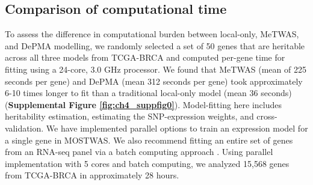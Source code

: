 \subsection{Comparison
of computational time}

To assess the difference in computational burden
between local-only, MeTWAS, and
DePMA modelling, we randomly selected a set of 50 genes
that are heritable across all three models
from TCGA-BRCA and computed per-gene
time for fitting using a 24-core, 3.0
GHz processor. We found that 
MeTWAS (mean of 225 seconds
per gene) and DePMA (mean 312 seconds
per gene) took approximately 6-10 times
longer to fit than a traditional local-only model
(mean 36 seconds) 
(\textbf{Supplemental Figure \ref{fig:ch4_suppfig0}}).
Model-fitting here includes heritability
estimation, estimating the SNP-expression
weights, and cross-validation.
We have implemented parallel options
to train an expression model for a single gene 
in MOSTWAS. We also recommend fitting an entire
set of genes from an RNA-seq panel 
via a batch computing
approach \cite{Bischl2015,KoSter2012GenomeEngine}.
Using parallel implementation with 5 cores
and batch computing, we analyzed
15,568 genes from TCGA-BRCA
in approximately 28 hours.